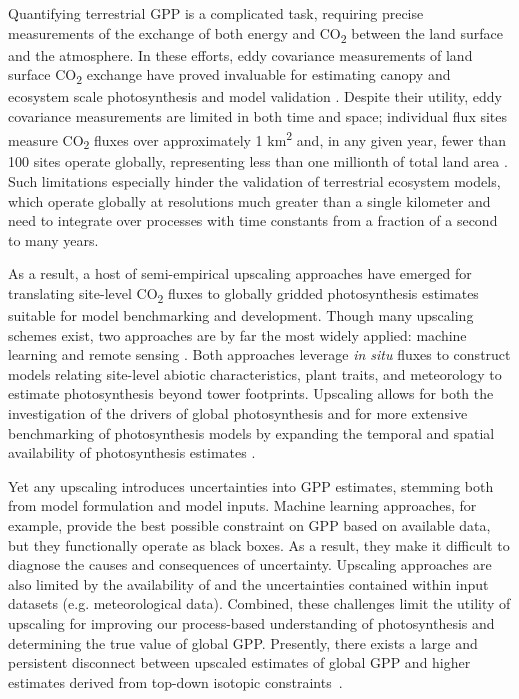 \documentclass[10pt,letterpaper]{article}
\begin{document}
Quantifying terrestrial GPP is a complicated task, requiring precise measurements of the exchange of both energy and CO\textsubscript{2} between the land surface and the atmosphere. In these efforts, eddy covariance measurements of land surface CO\textsubscript{2} exchange have proved invaluable for estimating canopy and ecosystem scale photosynthesis and model validation \cite{Baldocchi2001, baldocchi2008breathing}. Despite their utility, eddy covariance measurements are  limited in both time and space; individual flux sites measure CO\textsubscript{2} fluxes over approximately  1 km\textsuperscript{2} and, in any given year, fewer than 100 sites operate globally, representing less than one millionth of total land area \cite{kumar2016}. Such limitations especially hinder the validation of terrestrial ecosystem models, which operate globally at resolutions much greater than a single kilometer and need to integrate over processes with time constants from a fraction of a second to many years. 

As a result, a host of semi-empirical upscaling approaches have emerged for translating site-level CO\textsubscript{2} fluxes to globally gridded photosynthesis estimates suitable for model benchmarking and development. Though many upscaling schemes exist, two approaches are by far the most widely applied: machine learning \cite{beer2010terrestrial, tramontana2016predicting} and remote sensing \cite{Running2004}. Both approaches leverage \textit{in situ} fluxes to construct models relating site-level abiotic characteristics, plant traits, and meteorology to estimate photosynthesis beyond tower footprints. Upscaling allows for both the investigation of the drivers of global photosynthesis \cite{jung2017compensatory, zhao2010drought} and for more extensive benchmarking of photosynthesis models by expanding the temporal and spatial availability of photosynthesis estimates \cite{Bonan2011, Williams2009}.

Yet any upscaling introduces uncertainties into GPP estimates, stemming both from model formulation and model inputs. Machine learning approaches, for example, provide the best possible constraint on GPP based on available data, but they functionally operate as black boxes. As a result, they make it difficult to diagnose the causes and consequences of uncertainty. Upscaling approaches are also limited by the availability of and the uncertainties contained within input datasets (e.g. meteorological data). Combined, these challenges limit the utility of upscaling for improving our process-based understanding of photosynthesis and determining the true value of global GPP. Presently, there exists a large and persistent disconnect between upscaled estimates of global GPP and higher estimates derived from top-down isotopic constraints~\cite{Welp2011}.
\end{document}
